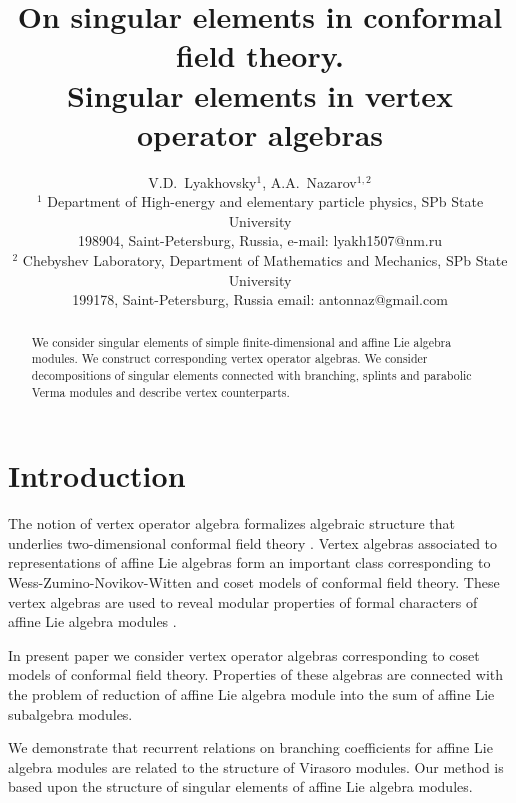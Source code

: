 \documentclass[12pt]{article}
\begin{document}
\title{On singular elements in conformal field theory. \\ Singular elements in vertex operator algebras}



\author{V.D.~Lyakhovsky$^1$, A.A.~Nazarov$^{1,2}$ \\
  {\small $^1$ Department of High-energy and elementary particle physics, SPb State University}\\
  {\small 198904, Saint-Petersburg, Russia,}
  {\small e-mail: lyakh1507@nm.ru}\\
  {\small$^{2}$ Chebyshev Laboratory,}
  {\small Department of Mathematics and Mechanics, SPb State University}\\
  {\small 199178, Saint-Petersburg, Russia}
  {\small email: antonnaz@gmail.com}}
\date{}
\maketitle

\begin{abstract}
  We consider singular elements of simple finite-dimensional and affine Lie algebra modules. We
  construct corresponding vertex operator algebras. We consider decompositions of singular elements
  connected with branching, splints and parabolic Verma modules and describe vertex counterparts. 
\end{abstract}

\section{Introduction}
The notion of vertex operator algebra \cite{borcherds1986vertex} formalizes algebraic structure that
underlies two-dimensional conformal field theory \cite{kac1998vertex,frenkel1988vertex}. Vertex
algebras associated to representations of affine Lie algebras \cite{frenkel1992vertex} form an
important class corresponding to Wess-Zumino-Novikov-Witten \cite{witten1984nab,Walton:1999xc} and
coset models \cite{Goddard198588} of conformal field theory. These vertex algebras are used to
reveal modular properties of formal characters of affine Lie algebra modules \cite{zhu1996modular}. 

In present paper we consider vertex operator algebras corresponding to coset models of conformal
field theory. Properties of these algebras are connected with the problem of reduction of affine Lie
algebra module into the sum of affine Lie subalgebra modules. 

We demonstrate that recurrent relations on branching coefficients for affine Lie algebra modules are
related to the structure of Virasoro modules. Our method is based upon the structure of singular
elements of affine Lie algebra modules.
\end{document}
